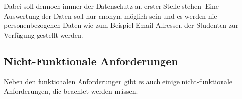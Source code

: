 \begin{itemize}
        Dabei soll dennoch immer der Datenschutz an erster Stelle stehen. Eine Auswertung der Daten soll nur anonym möglich sein und es werden nie personenbezogenen Daten wie zum Beispiel Email-Adressen der Studenten zur Verfügung gestellt werden.
  
\end{itemize}



\subsection{Nicht-Funktionale Anforderungen}
Neben den funktionalen Anforderungen gibt es auch einige nicht-funktionale Anforderungen, die beachtet werden müssen.
